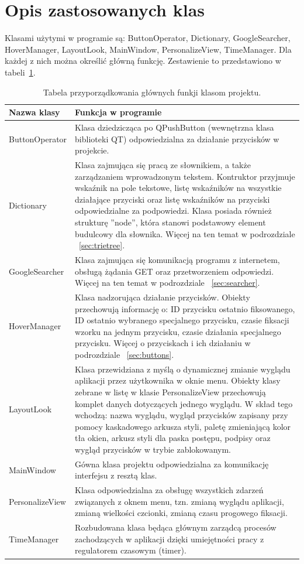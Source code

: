 \documentclass[twoside,a4paper]{book}
\begin{document}
\section{Opis zastosowanych klas}\label{sec:klas}
Klasami użytymi w programie są: ButtonOperator, Dictionary, GoogleSearcher, HoverManager, LayoutLook, MainWindow, PersonalizeView, TimeManager. Dla każdej z nich można określić główną funkcję. Zestawienie to przedstawiono w tabeli~\ref{table:classTab}.
\begin{table}
\renewcommand\arraystretch{1.5}
 \centering
    \begin{tabular}{|>{\centering\arraybackslash}m{4cm}|m{8.5cm}|}
     \hline
    \textbf{Nazwa klasy} & \textbf{Funkcja w programie}\\ \hline
     ButtonOperator& Klasa dziedzicząca po QPushButton (wewnętrzna klasa biblioteki QT) odpowiedzialna za działanie przycisków w projekcie.\\ \hline 
     Dictionary & Klasa zajmująca się pracą ze słownikiem, a także zarządzaniem wprowadzonym tekstem. Kontruktor przyjmuje wskaźnik na pole tekstowe, listę wskaźników na wszystkie działające przyciski oraz listę wskaźników na przyciski odpowiedzialne za podpowiedzi. Klasa posiada również strukturę ''node'', która stanowi podstawowy element budulcowy dla słownika. Więcej na ten temat w podrozdziale ~\ref{sec:trietree}.  \\ \hline
     GoogleSearcher & Klasa zajmująca się komunikacją programu z internetem, obsługą żądania GET oraz przetworzeniem odpowiedzi. Więcej na ten temat w podrozdziale ~\ref{sec:searcher}.\\ \hline
     HoverManager& Klasa nadzorująca działanie przycisków. Obiekty przechowują informację o: ID przycisku ostatnio fiksowanego, ID ostatnio wybranego specjalnego przycisku, czasie fiksacji wzorku na jednym przycisku, czasie działania specjalnego przycisku. Więcej o przyciskach i ich działaniu w podrozdziale ~\ref{sec:buttons}.\\ \hline
     LayoutLook& Klasa przewidziana z myślą o dynamicznej zmianie wyglądu aplikacji przez użytkownika w oknie menu. Obiekty klasy zebrane w listę w klasie PersonalizeView przechowują komplet danych dotyczących jednego wyglądu. W skład tego wchodzą: nazwa wyglądu, wygląd przycisków zapisany przy pomocy kaskadowego arkusza styli, paletę zmieniającą kolor tła okien, arkusz styli dla paska postępu, podpisy oraz wygląd przycisków w trybie zablokowanym.\\ \hline
     MainWindow& Gówna klasa projektu odpowiedzialna za komunikację interfejsu z resztą klas.\\ \hline
     PersonalizeView & Klasa odpowiedzialna za obsługę wszystkich zdarzeń związanych z oknem menu, tzn. zmianą wyglądu aplikacji, zmianą wielkości czcionki, zmianą czasu progowego fiksacji.\\ \hline
     TimeManager & Rozbudowana klasa będąca głównym zarządcą procesów zachodzących w aplikacji dzięki umiejętności pracy z regulatorem czasowym (timer). \\ \hline 
    
	\end{tabular}
	 \caption{Tabela przyporządkowania głównych funkji klasom projektu.} 
    \label{table:classTab}
\end{table}
\end{document}
